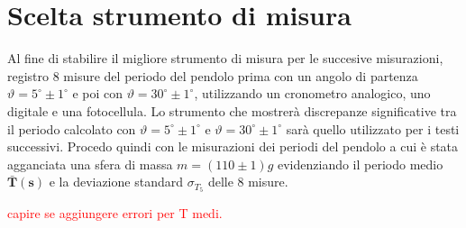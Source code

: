 \documentclass{article}
\begin{document}
	
	
	
	
	\newpage
	\section{Scelta strumento di misura}
	
	Al fine di stabilire il migliore strumento di misura per le succesive misurazioni, registro 8 misure del periodo del pendolo prima con un angolo di partenza $\vartheta = 5^\circ \pm1^\circ$ e poi con $\vartheta = 30^\circ\pm1^\circ$, utilizzando un cronometro analogico, uno digitale e una fotocellula. Lo strumento che mostrerà discrepanze significative tra il periodo calcolato con $\vartheta = 5^\circ\pm1^\circ$ e $\vartheta = 30^\circ\pm1^\circ$ sarà quello utilizzato per i testi successivi. Procedo quindi con le misurazioni dei periodi del pendolo a cui è stata agganciata una sfera di massa $m = (110 \pm 1)g$ evidenziando il periodo medio $\mathbf{\bar{T}(s)}$ e la deviazione standard $\sigma_{T_{5}}$ delle 8 misure. 
	
	\textcolor{red}{capire se aggiungere errori per T medi.}
	
\end{document}
